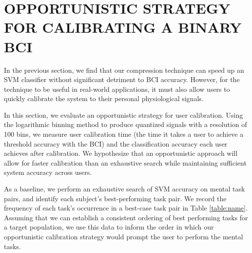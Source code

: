 \section{\uppercase{Opportunistic strategy for calibrating a binary BCI}}
\label{sec:calibration_eval}

\noindent In the previous section, we find that our compression technique can speed up an SVM classifier without significant detriment to BCI accuracy. However, for the technique to be useful in real-world applications, it must also allow users to quickly calibrate the system to their personal physiological signals.

In this section, we evaluate an opportunistic strategy for user calibration. Using the logarithmic binning method to produce quantized signals with a resolution of 100 bins, we measure user calibration time (the time it takes a user to achieve a threshold accuracy with the BCI) and the classification accuracy each user achieves after calibration. We hypothesize that an opportunistic approach will allow for faster calibration than an exhaustive search while maintaining sufficient system accuracy across users.



As a baseline, we perform an exhaustive search of SVM accuracy on mental task pairs, and identify each subject's best-performing task pair. We record the frequency of each task's occurrence in a best-case task pair in Table \ref{table:name}. Assuming that we can establish a consistent ordering of best performing tasks for a target population, we use this data to inform the order in which our opportunistic calibration strategy would prompt the user to perform the mental tasks.


